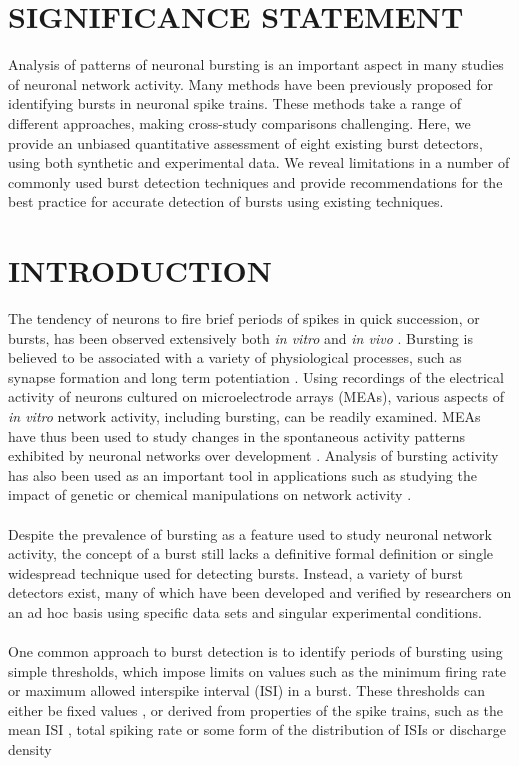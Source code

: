 \documentclass[12pt, titlepage]{article}
\begin{document}
	\section*{SIGNIFICANCE STATEMENT}
	Analysis of patterns of neuronal bursting is an important aspect in many studies of neuronal network activity. Many methods have been previously proposed for identifying bursts in neuronal spike trains. These methods take a range of different approaches, making cross-study comparisons challenging. Here, we provide an unbiased quantitative assessment of eight existing burst detectors, using both synthetic and experimental data. We reveal limitations in a number of commonly used burst detection techniques and provide recommendations for the best practice for accurate detection of bursts using existing techniques. 
	\section*{INTRODUCTION}
	The tendency of neurons to fire brief periods of spikes in quick succession, or bursts, has been observed extensively both \textit{in vitro} and \textit{in vivo} \cite{Weyand2001,Pasquale2010}. Bursting is believed to be associated with a variety of physiological processes, such as synapse formation \cite{Maeda1995} and long term potentiation \cite{Lisman1997}. Using recordings of the electrical activity of neurons cultured on microelectrode arrays (MEAs), various aspects of \textit{in vitro} network activity, including bursting, can be readily examined. MEAs have thus been used to study changes in the spontaneous activity patterns exhibited by neuronal networks over development \cite{Wagenaar2006,Charlesworth2015}. Analysis of bursting activity has also been used as an important tool in applications such as studying the impact of genetic or chemical manipulations on network activity \cite{Eisenman2015,Charlesworth2016}. 
	\\ \\ Despite the prevalence of bursting as a feature used to study neuronal network activity, the concept of a burst still lacks a definitive formal definition \cite{Cocatre-Zilgien1992,Gourevitch2007} or single widespread technique used for detecting bursts. Instead, a variety of burst detectors exist, many of which have been developed and verified by researchers on an ad hoc basis using specific data sets and singular experimental conditions. 
	\\\\One common approach to burst detection is to identify periods of bursting using simple thresholds, which impose limits on values such as the minimum firing rate or maximum allowed interspike interval (ISI) in a burst. These thresholds can either be fixed values  \cite{Chiappalone2005,Mukai2003},  or derived from properties of the spike trains, such as the mean ISI \cite{Chen2009}, total spiking rate \cite{Pimashkin2011} or some form of the distribution of ISIs or discharge density 
\end{document}

